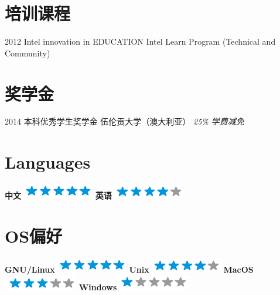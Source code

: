 \documentclass[]{friggeri-cv}
\begin{document}
\section{培训课程}
\begin{entrylist}
  \entry
    {2012}
    {Intel innovation in EDUCATION}
    {Intel Learn Program (Technical and Community)}

\end{entrylist}

\section{奖学金}
\begin{entrylist}
  \entry
    {2014}
    {本科优秀学生奖学金}
    {伍伦贡大学（澳大利亚）}
    {\emph{25\% 学费减免}}
\end{entrylist}

\begin{aside}
  \section{Languages}
    \textbf{中文}\includegraphics[scale=0.40]{img/5stars.png}
    \textbf{英语}\includegraphics[scale=0.40]{img/4stars.png}
    ~
  \section{OS偏好}
    \textbf{GNU/Linux}\includegraphics[scale=0.40]{img/5stars.png}
    \textbf{Unix}\includegraphics[scale=0.40]{img/4stars.png}
    \textbf{MacOS}\includegraphics[scale=0.40]{img/3stars.png}
    \textbf{Windows}\includegraphics[scale=0.40]{img/1stars.png}
    ~
\end{aside}
\end{document}
